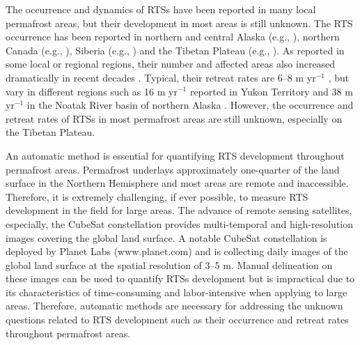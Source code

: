 \documentclass[authoryear,preprint,review,12pt]{elsarticle}
\begin{document}
The occurrence and dynamics of RTSs have been reported in many local permafrost areas, but their development in most areas is still unknown. 
The RTS occurrence has been reported in northern and central Alaska (e.g., \citealp{swanson2018growth,balser2014timing}), northern Canada (e.g., \citealp{burn1990canadian, cassidy2017impacts, armstrong2018thaw,lewkowicz2019extremes}), Siberia (e.g., \citealp{leibman2003dynamics, zwieback2018sub}) and the Tibetan Plateau (e.g., \citealp{niu2005engineering, niu2016thaw}). 
As reported in some local or regional regions, their number and affected areas also increased dramatically in recent decades \citep{luo2019recent, lewkowicz2019extremes}.
Typical, their retreat rates are 6--8 m yr$^{-1}$ \citep{jorgenson_thermokarst_2013}, but vary in different regions such as 16 m yr$^{-1}$ reported in Yukon Territory \citep{burn1989geomorphology} and 38 m yr$^{-1}$  in the Noatak River basin of northern  Alaska \citep{swanson2018growth}.
However, the occurrence and retreat rates of RTSs in most permafrost areas are still unknown, especially on the Tibetan Plateau. 

An automatic method is essential for quantifying RTS development throughout permafrost areas. 
Permafrost underlays approximately one-quarter of the land surface in the Northern Hemisphere \citep{zhang1999statistics} and most areas are remote and inaccessible. %
Therefore, it is extremely challenging, if ever possible, to measure RTS development in the field for large areas. %
The advance of remote sensing satellites, especially, the CubeSat constellation provides multi-temporal and high-resolution images covering the global land surface. 
A notable CubeSat constellation is deployed by Planet Labs (www.planet.com) and is collecting daily images of the global land surface at the spatial resolution of 3--5 m.
Manual delineation on these images can be used to quantify RTSs development but is impractical due to its characteristics of time-consuming and labor-intensive when applying to large areas. %
Therefore, automatic methods are necessary for addressing the unknown questions related to RTS development such as their occurrence and retreat rates throughout permafrost areas. 
\end{document}
